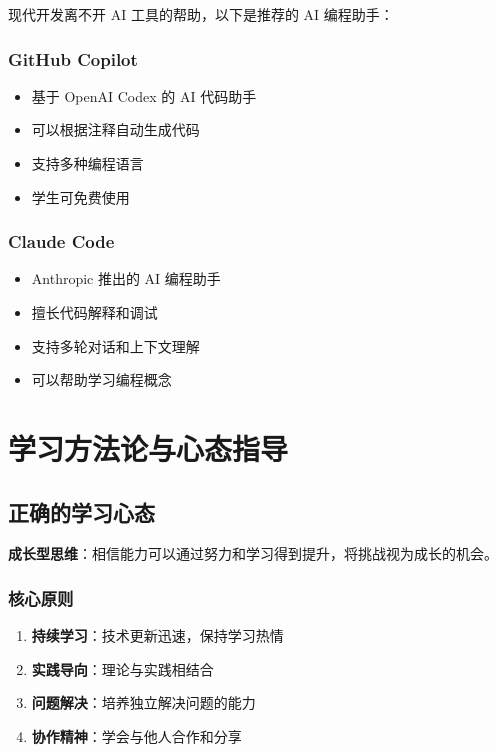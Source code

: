 \documentclass[a4paper,12pt]{article}
\begin{document}
现代开发离不开 AI 工具的帮助，以下是推荐的 AI 编程助手：

\subsubsection{GitHub Copilot}
\begin{itemize}
    \item 基于 OpenAI Codex 的 AI 代码助手
    \item 可以根据注释自动生成代码
    \item 支持多种编程语言
    \item 学生可免费使用
\end{itemize}

\subsubsection{Claude Code}
\begin{itemize}
    \item Anthropic 推出的 AI 编程助手
    \item 擅长代码解释和调试
    \item 支持多轮对话和上下文理解
    \item 可以帮助学习编程概念
\end{itemize}

\section{学习方法论与心态指导}

\subsection{正确的学习心态}

\begin{tipbox}
\textbf{成长型思维}：相信能力可以通过努力和学习得到提升，将挑战视为成长的机会。
\end{tipbox}

\subsubsection{核心原则}
\begin{enumerate}
    \item \textbf{持续学习}：技术更新迅速，保持学习热情
    \item \textbf{实践导向}：理论与实践相结合
    \item \textbf{问题解决}：培养独立解决问题的能力
    \item \textbf{协作精神}：学会与他人合作和分享
\end{enumerate}
\end{document}
